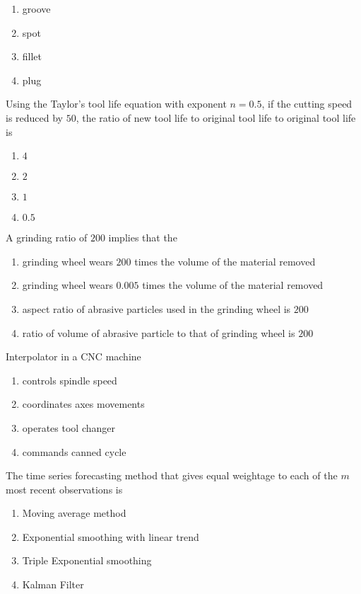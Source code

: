     \begin{enumerate}
        \item groove
        \item spot
        \item fillet
        \item plug
    \end{enumerate}
    \item Using the Taylor's tool life equation with exponent $n=0.5$, if the cutting speed is reduced by $50$, the ratio of new tool life to original tool life to original tool life is 
    \begin{enumerate}
        \item $4$
        \item $2$
        \item $1$
        \item $0.5$
    \end{enumerate}
    \item A grinding ratio of $200$ implies that the 
    \begin{enumerate}
        \item grinding wheel wears $200$ times the volume of the material removed
        \item grinding wheel wears $0.005$ times the volume of the material removed
        \item aspect ratio of abrasive particles used in the grinding wheel is $200$
        \item ratio of volume of abrasive particle to that of grinding wheel is $200$
    \end{enumerate}
    \item Interpolator in a CNC machine
    \begin{enumerate}
        \item controls spindle speed
        \item coordinates axes movements
        \item operates tool changer
        \item commands canned cycle
    \end{enumerate}
    \item The time series forecasting method that gives equal weightage to each of the $m$ most recent observations is 
    \begin{enumerate}
        \item Moving average method
        \item Exponential smoothing with linear trend
        \item Triple Exponential smoothing 
        \item Kalman Filter
    \end{enumerate}
